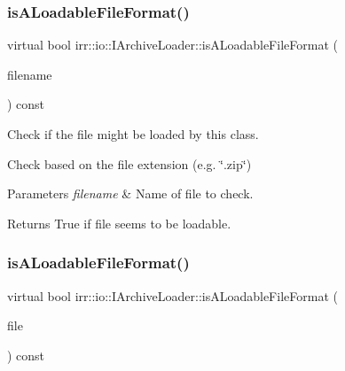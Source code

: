 \subsubsection{\texorpdfstring{is\+A\+Loadable\+File\+Format()}{isALoadableFileFormat()}\hspace{0.1cm}{\footnotesize\ttfamily [1/3]}}
{\footnotesize\ttfamily virtual bool irr\+::io\+::\+I\+Archive\+Loader\+::is\+A\+Loadable\+File\+Format (\begin{DoxyParamCaption}\item[{const \hyperlink{namespaceirr_1_1io_ab1bdc45edb3f94d8319c02bc0f840ee1}{path} \&}]{filename }\end{DoxyParamCaption}) const\hspace{0.3cm}{\ttfamily [pure virtual]}}



Check if the file might be loaded by this class. 

Check based on the file extension (e.\+g. \char`\"{}.\+zip\char`\"{}) 
\begin{DoxyParams}{Parameters}
{\em filename} & Name of file to check. \\
\hline
\end{DoxyParams}
\begin{DoxyReturn}{Returns}
True if file seems to be loadable. 
\end{DoxyReturn}
\mbox{\label{classirr_1_1io_1_1IArchiveLoader_acda22c3c2a5268665a4a4cf17379931b}} 
\subsubsection{\texorpdfstring{is\+A\+Loadable\+File\+Format()}{isALoadableFileFormat()}\hspace{0.1cm}{\footnotesize\ttfamily [2/3]}}
{\footnotesize\ttfamily virtual bool irr\+::io\+::\+I\+Archive\+Loader\+::is\+A\+Loadable\+File\+Format (\begin{DoxyParamCaption}\item[{\hyperlink{classirr_1_1io_1_1IReadFile}{io\+::\+I\+Read\+File} $\ast$}]{file }\end{DoxyParamCaption}) const\hspace{0.3cm}{\ttfamily [pure virtual]}}



